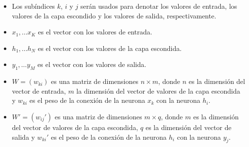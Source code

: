 \begin{itemize}
    \item Los subíndices $k$, $i$ y $j$ serán usados para denotar los valores de entrada, los valores de la
          capa escondido y los valores de salida, respectivamente.
    \item $x_1, \ldots x_K$ es el vector con los valores de entrada.
    \item $h_1, \ldots h_N$ es el vector con los valores de la capa escondida.
    \item $y_1, \ldots y_M$ es el vector con los valores de salida.
    \item $W = (w_{ki})$ es una matriz de dimensiones $n\times m$, donde $n$ es la dimensión
          del vector de entrada, $m$ la dimensión del vector de valores de la capa escondida y $w_{ki}$ es el peso de la conexión de la
          neurona $x_k$ con la neurona $h_i$.
    \item $W' = (w_{ij}')$ es una matriz de dimensiones $m\times q$, donde $m$ es la dimensión
          del vector de valores de la capa escondida, $q$ es la dimensión del vector de salida y $w_{ki}'$
          es el peso de la conexión de la neurona $h_i$ con la neurona $y_j$.
\end{itemize}

